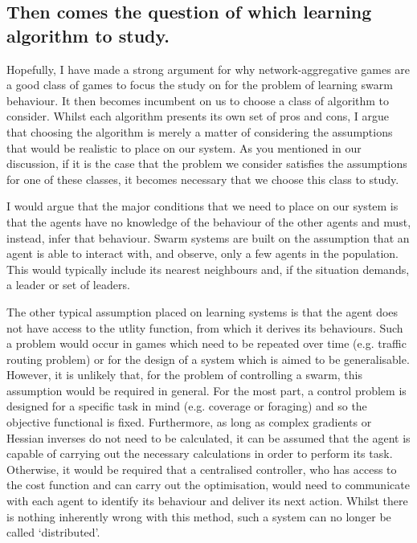 \documentclass{article}
\begin{document}
\subsection*{Then comes the question of which learning algorithm to study.} %

Hopefully, I have made a strong argument for why network-aggregative games are a good class of games
to focus the study on for the problem of learning swarm behaviour. It then becomes incumbent on us
to choose a class of algorithm to consider. Whilst each algorithm presents its own set of pros and
cons, I argue that choosing the algorithm is merely a matter of considering the assumptions that
would be realistic to place on our system. As you mentioned in our discussion, if it is the case
that the problem we consider satisfies the assumptions for one of these classes, it becomes
necessary that we choose this class to study.

I would argue that the major conditions that we need to place on our system is that the agents have
no knowledge of the behaviour of the other agents and must, instead, infer that behaviour. Swarm
systems are built on the assumption that an agent is able to interact with, and observe, only a few
agents in the population. This would typically include its nearest neighbours and, if the situation
demands, a leader or set of leaders. 

The other typical assumption placed on learning systems is that the agent does not have access to
the utlity function, from which it derives its behaviours. Such a problem would occur in games which
need to be repeated over time (e.g. traffic routing problem) or for the design of a system which is
aimed to be generalisable. However, it is unlikely that, for the problem of controlling a swarm,
this assumption would be required in general. For the most part, a control problem is designed for a
specific task in mind (e.g. coverage or foraging) and so the objective functional is fixed.
Furthermore, as long as complex gradients or Hessian inverses do not need to be calculated, it can
be assumed that the agent is capable of carrying out the necessary calculations in order to perform
its task. Otherwise, it would be required that a centralised controller, who has access to the cost
function and can carry out the optimisation, would need to communicate with each agent to identify
its behaviour and deliver its next action. Whilst there is nothing inherently wrong with this
method, such a system can no longer be called `distributed'.
\end{document}
